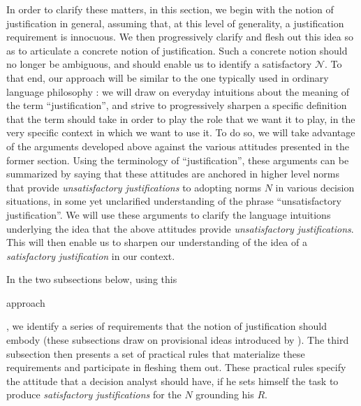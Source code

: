 \documentclass[preprint, french, english, 11pt, authoryear]{elsarticle}%
\newcommand{\adv}{\mathscr{N}}
\begin{document}
In order to clarify these matters, in this section, we begin with the notion of justification in general, assuming that, at this level of generality, a justification requirement is innocuous. %
We then progressively clarify and flesh out this idea so as to articulate a concrete notion of justification. Such a concrete notion should no longer be ambiguous, and should enable us to identify a satisfactory $\adv$. To that end, our approach will be similar to the one typically used in ordinary language philosophy \citep{soames_philosophical_2003}: we will draw on everyday intuitions about the meaning of the term ``justification'', and strive to progressively sharpen a specific definition that the term should take in order to play the role that we want it to play, in the very specific context in which we want to use it. To do so, we will take advantage of the arguments developed above against the various attitudes presented in the former section. Using the terminology of ``justification'', these arguments can be summarized by saying that these attitudes are anchored in higher level norms that provide \emph{unsatisfactory justifications} to adopting norms $N$ in various decision situations, in some yet unclarified understanding of the phrase ``unsatisfactory justification''. We will use these arguments to clarify the language intuitions underlying the idea that the above attitudes provide \emph{unsatisfactory justifications}. This will then enable us to sharpen our understanding of the idea of a \emph{satisfactory justification} in our context.

In the two subsections below, using this \begin{changebar}approach\end{changebar}, we identify a series of requirements that the notion of justification should embody (these subsections draw on provisional ideas introduced by \citet{meinard_du_2013, meinard_what_2017}). The third subsection then presents a set of practical rules that materialize these requirements and participate in fleshing them out. These practical rules specify the attitude that a decision analyst should have, if he sets himself the task to produce \emph{satisfactory justifications} for the $N$ grounding his $R$.
\end{document}
